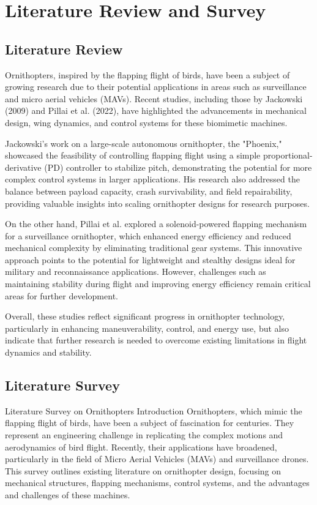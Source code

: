 \chapter{Literature Review and Survey}

\section{Literature Review}
Ornithopters, inspired by the flapping flight of birds, have been a subject of growing research due to their potential applications in areas such as surveillance and micro aerial vehicles (MAVs). Recent studies, including those by Jackowski (2009) and Pillai et al. (2022), have highlighted the advancements in mechanical design, wing dynamics, and control systems for these biomimetic machines. 

Jackowski's work on a large-scale autonomous ornithopter, the "Phoenix," showcased the feasibility of controlling flapping flight using a simple proportional-derivative (PD) controller to stabilize pitch, demonstrating the potential for more complex control systems in larger applications. His research also addressed the balance between payload capacity, crash survivability, and field repairability, providing valuable insights into scaling ornithopter designs for research purposes. 

On the other hand, Pillai et al. explored a solenoid-powered flapping mechanism for a surveillance ornithopter, which enhanced energy efficiency and reduced mechanical complexity by eliminating traditional gear systems. This innovative approach points to the potential for lightweight and stealthy designs ideal for military and reconnaissance applications. However, challenges such as maintaining stability during flight and improving energy efficiency remain critical areas for further development. 

Overall, these studies reflect significant progress in ornithopter technology, particularly in enhancing maneuverability, control, and energy use, but also indicate that further research is needed to overcome existing limitations in flight dynamics and stability.

\section{Literature Survey}
Literature Survey on Ornithopters Introduction Ornithopters, which mimic the flapping flight of birds, have been a subject of fascination for centuries. They represent an engineering challenge in replicating the complex motions and aerodynamics of bird flight. Recently, their applications have broadened, particularly in the field of Micro Aerial Vehicles (MAVs) and surveillance drones. This survey outlines existing literature on ornithopter design, focusing on mechanical structures, flapping mechanisms, control systems, and the advantages and challenges of these machines.

